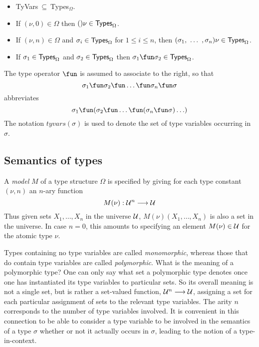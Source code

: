 \begin{itemize}

\item {\sf TyVars}$\ \subseteq\ ${\sf Types}$_{\Omega}$.

\item If $(\nu,0)\in\Omega$ then $()\nu\in{\sf Types}_{\Omega}$.

\item If $(\nu,n)\in\Omega$ and $\sigma_i\in{\sf Types}_{\Omega}$ for
$1\leq i\leq n$, then $(\sigma_1,\ \ldots\ ,\sigma_n)\nu\in{\sf
Types}_{\Omega}$.

\item If $\sigma_1\in{\sf Types}_{\Omega}$ and $\sigma_2\in{\sf
Types}_{\Omega}$ then $\sigma_1\fun\sigma_2\in{\sf Types}_{\Omega}$.


\end{itemize}
The type operator $\fun$ is assumed to associate to the
right, so that
\[ 
\sigma_1\fun\sigma_2\fun\ldots\fun \sigma_n\fun\sigma 
\]
abbreviates
\[ 
\sigma_1\fun(\sigma_2\fun\ldots\fun (\sigma_n\fun\sigma)\ldots) 
\]
The notation $tyvars(\sigma)$ is used to denote the set of type
variables occurring in $\sigma$.

\subsection{Semantics of types}
\label{semantics of types}


A {\em model} $M$ of a type structure $\Omega$ is specified by giving
for each type constant $(\nu,n)$ an $n$-ary function
\[ 
M(\nu):{\cal U}^{n}\longrightarrow{\cal U} 
\]
Thus given sets $X_1,\ldots,X_n$ in the universe $\cal U$,
$M(\nu)(X_1,\ldots,X_n)$ is also a set in the universe.  In case $n=0$,
this amounts to specifying an element $M(\nu)\in{\cal U}$ for the
atomic type $\nu$.

Types containing no type variables are called {\it monomorphic},
whereas those that do contain type variables are called {\it
polymorphic}. What is the meaning of a polymorphic type? One can
only say what set a polymorphic type denotes once one has instantiated
its type variables to particular sets. So its overall meaning is not a
single set, but is rather a set-valued function, ${\cal
U}^{n}\longrightarrow{\cal U}$, assigning a set for each particular
assignment of sets to the relevant type variables. The arity $n$
corresponds to the number of type variables involved. It is convenient
in this connection to be able to consider a type variable to be
involved in the semantics of a type $\sigma$ whether or not it
actually occurs in $\sigma$, leading to the notion of a
type-in-context.

